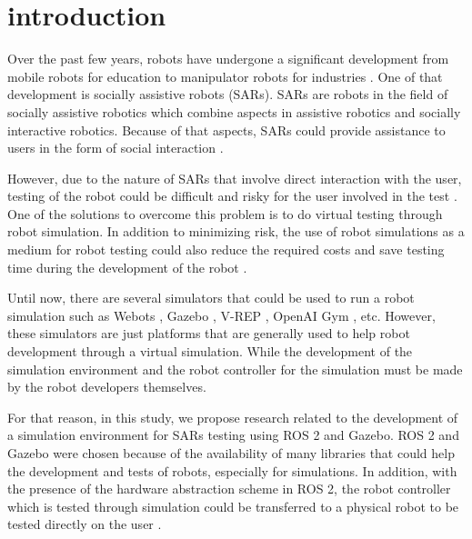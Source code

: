 \section{introduction}
\label{sec:introduction}

Over the past few years,
  robots have undergone a significant development from mobile robots for education \citep{goncalves2009} to manipulator robots for industries \citep{Blatnicky2020}.
One of that development is socially assistive robots (SARs).
SARs are robots in the field of socially assistive robotics which combine aspects in assistive robotics and socially interactive robotics.
Because of that aspects,
  SARs could provide assistance to users in the form of social interaction \citep{seifer2005}.

However, due to the nature of SARs that involve direct interaction with the user,
  testing of the robot could be difficult and risky for the user involved in the test \citep{erickson2020}.
One of the solutions to overcome this problem is to do virtual testing through robot simulation.
In addition to minimizing risk,
  the use of robot simulations as a medium for robot testing could also reduce the required costs and save testing time during the development of the robot \citep{takaya2016}.

Until now, there are several simulators that could be used to run a robot simulation such as Webots \citep{michel2004}, Gazebo \citep{koenig2004}, V-REP \citep{rohmer2013}, OpenAI Gym \citep{brockman2016}, etc.
However, these simulators are just platforms that are generally used to help robot development through a virtual simulation.
While the development of the simulation environment and the robot controller for the simulation must be made by the robot developers themselves.

For that reason, in this study,
  we propose research related to the development of a simulation environment for SARs testing using ROS 2 and Gazebo.
ROS 2 and Gazebo were chosen because of the availability of many libraries that could help the development and tests of robots, especially for simulations.
In addition, with the presence of the hardware abstraction scheme in ROS 2,
  the robot controller which is tested through simulation could be transferred to a physical robot to be tested directly on the user \citep{takaya2016}.

